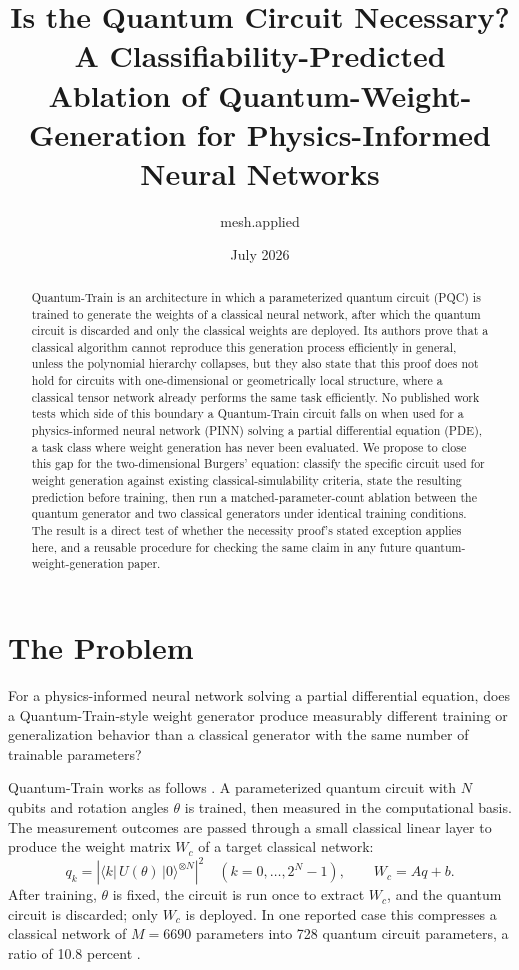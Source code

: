 \documentclass[10pt,a4paper]{article}
\title{\textbf{Is the Quantum Circuit Necessary?}\\
\large A Classifiability-Predicted Ablation of Quantum-Weight-Generation for Physics-Informed Neural Networks}
\author{mesh.applied}
\date{July 2026}
\begin{document}
\maketitle

\begin{abstract}
Quantum-Train is an architecture in which a parameterized quantum circuit (PQC) is trained to generate the weights of a classical neural network, after which the quantum circuit is discarded and only the classical weights are deployed. Its authors prove that a classical algorithm cannot reproduce this generation process efficiently in general, unless the polynomial hierarchy collapses, but they also state that this proof does not hold for circuits with one-dimensional or geometrically local structure, where a classical tensor network already performs the same task efficiently. No published work tests which side of this boundary a Quantum-Train circuit falls on when used for a physics-informed neural network (PINN) solving a partial differential equation (PDE), a task class where weight generation has never been evaluated. We propose to close this gap for the two-dimensional Burgers' equation: classify the specific circuit used for weight generation against existing classical-simulability criteria, state the resulting prediction before training, then run a matched-parameter-count ablation between the quantum generator and two classical generators under identical training conditions. The result is a direct test of whether the necessity proof's stated exception applies here, and a reusable procedure for checking the same claim in any future quantum-weight-generation paper.
\end{abstract}

\section{The Problem}

For a physics-informed neural network solving a partial differential equation, does a Quantum-Train-style weight generator produce measurably different training or generalization behavior than a classical generator with the same number of trainable parameters?

Quantum-Train works as follows \cite{liu2024}. A parameterized quantum circuit with $N$ qubits and rotation angles $\theta$ is trained, then measured in the computational basis. The measurement outcomes are passed through a small classical linear layer to produce the weight matrix $W_c$ of a target classical network:
\[
q_k = \left|\langle k|\,U(\theta)\,|0\rangle^{\otimes N}\right|^2 \quad (k=0,\dots,2^N-1), \qquad W_c = Aq + b.
\]
After training, $\theta$ is fixed, the circuit is run once to extract $W_c$, and the quantum circuit is discarded; only $W_c$ is deployed. In one reported case this compresses a classical network of $M=6690$ parameters into 728 quantum circuit parameters, a ratio of 10.8 percent \cite{liu2024}.
\end{document}
